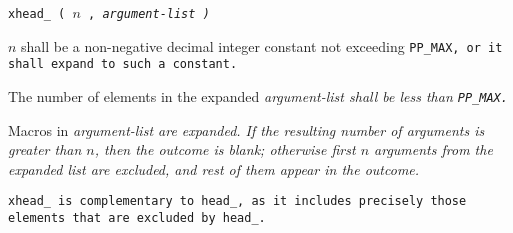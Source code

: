 
\tt{xhead_ (} $n$ \tt{,} \it{argument-list} \tt{)}


$n$ shall be a non-negative decimal integer constant not exceeding \tt{PP_MAX},
or it shall expand to such a constant.

The number of elements in the expanded
\it{argument-list} shall be less than \tt{PP_MAX}.


Macros in \it{argument-list} are expanded.
If the resulting number of arguments is greater than $n$,
then the outcome is  blank; otherwise first $n$ arguments from the
expanded list are excluded, and rest of them appear in the outcome.

\note \tt{xhead_} is complementary to \tt{head_},
as it includes precisely those elements that are excluded by \tt{head_}.
